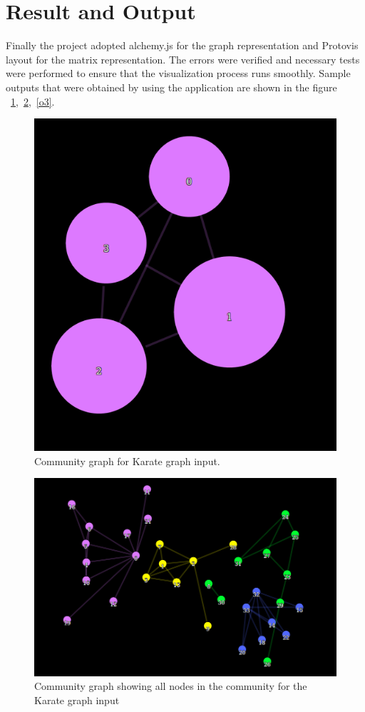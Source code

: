 \section{Result and Output}
Finally the project adopted alchemy.js for the graph representation and Protovis layout for the matrix representation.  The errors were verified and necessary tests were performed to ensure that the visualization process runs smoothly. Sample outputs that were obtained by using the application are shown in the figure ~\ref{o1},~\ref{o2},~\ref{o3}.
\begin{figure}[H]
\centering
\includegraphics[scale=0.3]{o1.png}
\caption{\label{o1}Community graph for Karate graph input.}
\end{figure}

\begin{figure}[H]
\centering
\includegraphics[scale=0.3]{o2.png}
\caption{\label{o2}Community graph showing all nodes in the community for the Karate graph input}
\end{figure}


